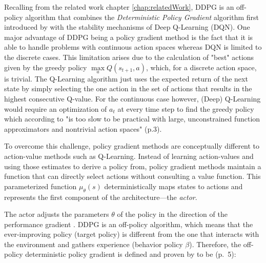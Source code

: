 Recalling from the related work chapter \ref{chap:relatedWork}, DDPG is an off-policy algorithm that combines the \textit{Deterministic Policy Gradient} algorithm first introduced by \cite{silver2014deterministic} with the stability mechanisms of Deep Q-Learning (DQN). One major advantage of DDPG being a policy gradient method is the fact that it is able to handle problems with continuous action spaces  \cite[p.3]{lillicrap2019continuous} whereas DQN is limited to the discrete cases. This limitation arises due to the calculation of "best" actions given by the greedy policy $\max\limits_{a} Q(s_{t+1},a)$, which, for a discrete action space, is trivial. The Q-Learning algorithm just uses the expected return of the next state by simply selecting the one action in the set of actions that results in the highest consecutive Q-value. For the continuous case however, (Deep) Q-Learning would require an optimization of $a_t$ at every time step to find the greedy policy which according to \cite{lillicrap2019continuous} "is too slow to be practical with large, unconstrained function approximators and nontrivial action spaces" (p.3).
\par
To overcome this challenge, policy gradient methods are conceptually different to action-value methods such as Q-Learning. Instead of learning action-values and using those estimates to derive a policy from, policy gradient methods maintain a function that can directly select actions without consulting a value function. This parameterized function $\mu_\theta(s)$ deterministically maps states to actions \cite[p.3]{lillicrap2019continuous} and represents the first component of the architecture—the \textit{actor}.
\par 
The actor adjusts the parameters $\theta$ of the policy in the direction of the performance gradient \cite[p.~2]{silver2014deterministic}. DDPG is an off-policy algorithm, which means that the ever-improving policy (target policy) is different from the one that interacts with the environment and gathers experience (behavior policy $\beta$). Therefore, the off-policy deterministic policy gradient is defined and proven by \cite{silver2014deterministic} to be (p.~5): 

